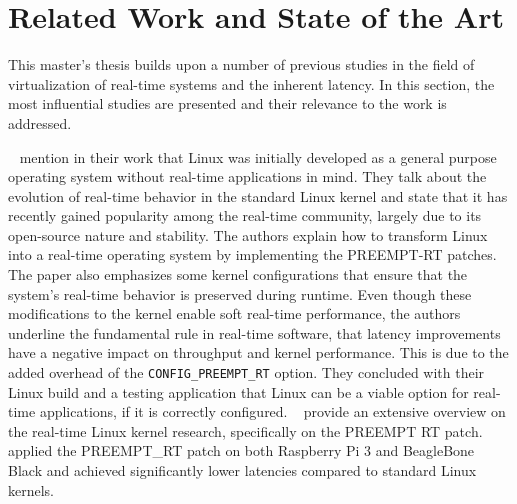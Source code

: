 \documentclass[MMR,Master,english]{twbook}
\begin{document}
\section{Related Work and State of the Art}
This master’s thesis builds upon a number of previous studies in the field of virtualization of real-time systems and the inherent latency. In this section, the most influential studies are presented and their relevance to the work is addressed.

\bigskip \noindent \citeauthor{perneelRealtimeCapabilitiesStandard2015}~\cite{perneelRealtimeCapabilitiesStandard2015} mention in their work that Linux was initially developed as a general purpose operating system without real-time applications in mind. They talk about the evolution of real-time behavior in the standard Linux kernel and state that it has recently gained popularity among the real-time community, largely due to its open-source nature and stability. The authors explain how to transform Linux into a real-time operating system by implementing the PREEMPT-RT patches. The paper also emphasizes some kernel configurations that ensure that the system's real-time behavior is preserved during runtime. Even though these modifications to the kernel enable soft real-time performance, the authors underline the fundamental rule in real-time software, that latency improvements have a negative impact on throughput and kernel performance. This is due to the added overhead of the \texttt{CONFIG\_PREEMPT\_RT} option. They concluded with their Linux build and a testing application that Linux can be a viable option for real-time applications, if it is correctly configured. \citeauthor{reghenzaniRealTimeLinuxKernel2020}~\cite{reghenzaniRealTimeLinuxKernel2020} provide an extensive overview on the real-time Linux kernel research, specifically on the PREEMPT RT patch. \citeauthor{adamRealTimePerformanceResponse2021}~\cite{adamRealTimePerformanceResponse2021} applied the PREEMPT\_RT patch on both Raspberry Pi 3 and BeagleBone Black and achieved significantly lower latencies compared to standard Linux kernels.
\end{document}
